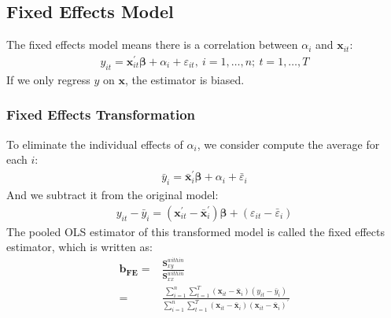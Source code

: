 \documentclass{article}
\begin{document}
	
\subsection{Fixed Effects Model}
The fixed effects model means there is a correlation between $\alpha_i$ and $\boldsymbol{x}_{it}$:
	\begin{align*}
		y_{it} = \boldsymbol{x}^\prime_{it} \boldsymbol{\beta} + \alpha_i + \varepsilon_{it},\ i = 1, \ldots, n;\ t = 1, \ldots, T
	\end{align*}
If we only regress $y$ on $\boldsymbol{x}$, the estimator is biased.

\subsubsection{Fixed Effects Transformation}
To eliminate the individual effects of $\alpha_i$, we consider compute the average for each $i$:
	\begin{align*}
		\bar{y}_i = \bar{\boldsymbol{x}}^\prime_{i} \boldsymbol{\beta} + \alpha_i + \bar{\varepsilon}_i
	\end{align*}
And we subtract it from the original model:
	\begin{align*}
		y_{it} - \bar{y}_i = (\boldsymbol{x}^\prime_{it} - \bar{\boldsymbol{x}}^\prime_{i}) \boldsymbol{\beta} + (\varepsilon_{it} - \bar{\varepsilon}_i)
	\end{align*}
The pooled OLS estimator of this transformed model is called the fixed effects estimator, which is written as:
	\begin{align*}
		\boldsymbol{b_{FE}} = &\frac{\boldsymbol{S}^{within}_{xy}}{\boldsymbol{S}^{within}_{xx}}\\ = &
		\frac{\sum^n_{i=1} \sum^T_{t=1} (\boldsymbol{x}_{it} - \bar{\boldsymbol{x}}_i)(y_{it} - \bar{y}_i)}{\sum^n_{i=1} \sum^T_{t=1} (\boldsymbol{x}_{it} - \bar{\boldsymbol{x}}_i) (\boldsymbol{x}_{it} - \bar{\boldsymbol{x}}_i)^\prime}
	\end{align*}
\end{document}
